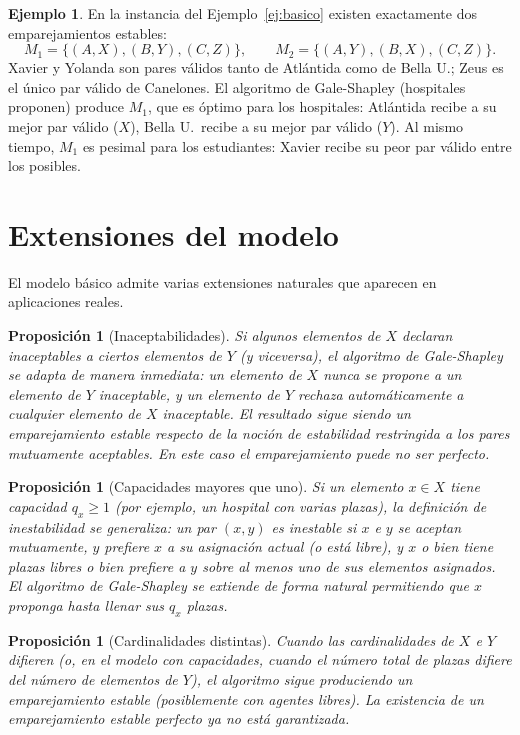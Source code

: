 \documentclass[12pt, spanish, oneside, openany]{book}
\theoremstyle{uprightplain}
\newtheorem{proposicion}[teorema]{Proposición}
\theoremstyle{definition}
\newtheorem{ejemplo}[teorema]{Ejemplo}
\theoremstyle{remark}
\theoremstyle{definition}
\begin{document}
\begin{ejemplo}
En la instancia del Ejemplo~\ref{ej:basico} existen exactamente dos emparejamientos estables:
\[
M_1 = \{(A,X),(B,Y),(C,Z)\},\qquad
M_2 = \{(A,Y),(B,X),(C,Z)\}.
\]
Xavier y Yolanda son pares válidos tanto de Atlántida como de Bella U.; Zeus es el único par válido de Canelones. El algoritmo de Gale-Shapley (hospitales proponen) produce $M_1$, que es óptimo para los hospitales: Atlántida recibe a su mejor par válido ($X$), Bella U.\ recibe a su mejor par válido ($Y$). Al mismo tiempo, $M_1$ es pesimal para los estudiantes: Xavier recibe su peor par válido entre los posibles.
\end{ejemplo}

\section{Extensiones del modelo}

El modelo básico admite varias extensiones naturales que aparecen en aplicaciones reales.

\begin{proposicion}[Inaceptabilidades]
Si algunos elementos de $X$ declaran inaceptables a ciertos elementos de $Y$ (y viceversa), el algoritmo de Gale-Shapley se adapta de manera inmediata: un elemento de $X$ nunca se propone a un elemento de $Y$ inaceptable, y un elemento de $Y$ rechaza automáticamente a cualquier elemento de $X$ inaceptable. El resultado sigue siendo un emparejamiento estable respecto de la noción de estabilidad restringida a los pares mutuamente aceptables. En este caso el emparejamiento puede no ser perfecto.
\end{proposicion}

\begin{proposicion}[Capacidades mayores que uno]
Si un elemento $x \in X$ tiene capacidad $q_x \ge 1$ (por ejemplo, un hospital con varias plazas), la definición de inestabilidad se generaliza: un par $(x,y)$ es inestable si $x$ e $y$ se aceptan mutuamente, $y$ prefiere $x$ a su asignación actual (o está libre), y $x$ o bien tiene plazas libres o bien prefiere a $y$ sobre al menos uno de sus elementos asignados. El algoritmo de Gale-Shapley se extiende de forma natural permitiendo que $x$ proponga hasta llenar sus $q_x$ plazas.
\end{proposicion}

\begin{proposicion}[Cardinalidades distintas]
Cuando las cardinalidades de $X$ e $Y$ difieren (o, en el modelo con capacidades, cuando el número total de plazas difiere del número de elementos de $Y$), el algoritmo sigue produciendo un emparejamiento estable (posiblemente con agentes libres). La existencia de un emparejamiento estable perfecto ya no está garantizada.
\end{proposicion}
\end{document}

